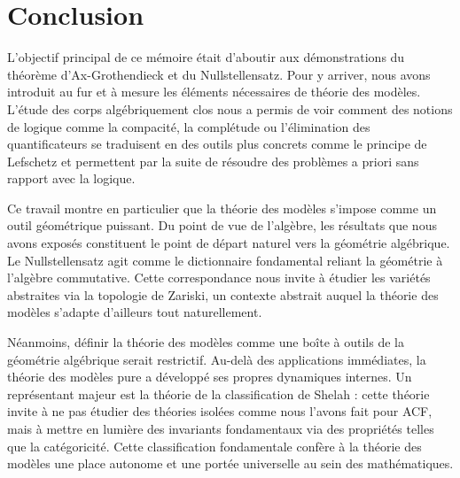 \chapter*{Conclusion}

L'objectif principal de ce mémoire était d'aboutir aux démonstrations du
théorème d'Ax-Grothendieck et du Nullstellensatz. Pour y arriver, nous avons
introduit au fur et à mesure les éléments nécessaires de théorie des modèles.
L'étude des corps algébriquement clos nous a permis de voir comment des notions
de logique comme la compacité, la complétude ou l'élimination des
quantificateurs se traduisent en des outils plus concrets comme le principe de
Lefschetz et permettent par la suite de résoudre des problèmes a priori sans
rapport avec la logique. 

Ce travail montre en particulier que la théorie des modèles s'impose comme un outil géométrique
puissant. Du point de vue de l'algèbre, les résultats que nous avons exposés
constituent le point de départ naturel vers la géométrie algébrique. Le
Nullstellensatz agit comme le dictionnaire fondamental reliant la géométrie à
l'algèbre commutative. Cette correspondance nous invite à étudier les variétés
abstraites via la topologie de Zariski, un contexte abstrait auquel la théorie
des modèles s'adapte d'ailleurs tout naturellement. 

Néanmoins, définir la théorie des modèles comme une boîte à outils de la géométrie algébrique serait restrictif.
Au-delà des applications immédiates, la théorie des modèles pure a développé ses propres dynamiques internes.
Un représentant majeur est la théorie de la classification de Shelah : cette théorie invite à ne pas étudier des théories isolées 
comme nous l'avons fait pour ACF, mais à mettre en lumière des invariants fondamentaux via des propriétés telles que la catégoricité.
Cette classification fondamentale confère à la théorie des modèles une place autonome et une portée universelle au sein des mathématiques.